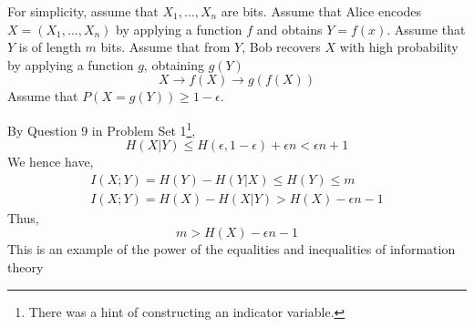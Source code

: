 \documentclass{article}
\begin{document}
For simplicity, assume that $X_1,\ldots, X_n$ are bits. Assume that Alice encodes $X=\left(X_1,\ldots, X_n \right)$ by applying a function $f$ and obtains $Y=f(x)$. Assume that $Y$ is of length $m$ bits. Assume that from $Y$, Bob recovers $X$ with high probability by applying a function $g$, obtaining $g(Y)$
\[
X\to f(X)\to g(f(X))
\]
Assume that $P(X=g(Y))\geq 1-\epsilon$.

By Question 9 in Problem Set 1\footnote{There was a hint of constructing an indicator variable.},
\[
H(X|Y) \leq H(\epsilon, 1-\epsilon) + \epsilon n < \epsilon n + 1
\]
We hence have,
\begin{gather*}
    I(X;Y) = H(Y) - H(Y|X)\leq H(Y) \leq m \\
    I(X;Y) = H(X) - H(X|Y) > H(X) -\epsilon n - 1
\end{gather*}
Thus,
\[
m > H(X) -\epsilon n - 1
\]
This is an example of the power of the equalities and inequalities of information theory
\end{document}

